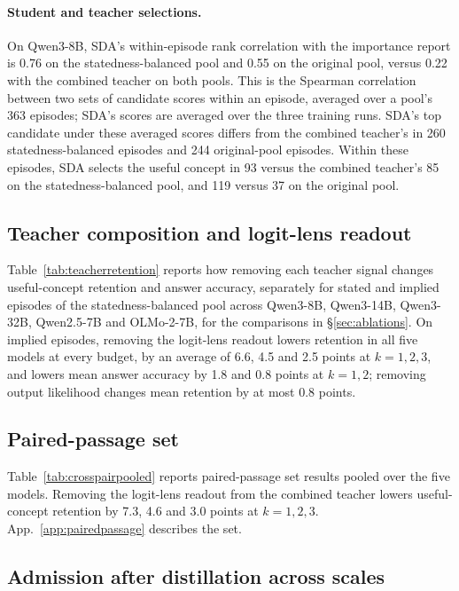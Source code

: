 \paragraph{Student and teacher selections.}
On Qwen3-8B, SDA's within-episode rank correlation with the importance report is 0.76 on the statedness-balanced pool and 0.55 on the original pool, versus 0.22 with the combined teacher on both pools. This is the Spearman correlation between two sets of candidate scores within an episode, averaged over a pool's 363 episodes; SDA's scores are averaged over the three training runs. SDA's top candidate under these averaged scores differs from the combined teacher's in 260 statedness-balanced episodes and 244 original-pool episodes. Within these episodes, SDA selects the useful concept in 93 versus the combined teacher's 85 on the statedness-balanced pool, and 119 versus 37 on the original pool.



\subsection{Teacher composition and logit-lens readout}
\label{app:teacherreadout}
Table~\ref{tab:teacherretention} reports how removing each teacher signal changes useful-concept retention and answer accuracy, separately for stated and implied episodes of the statedness-balanced pool across Qwen3-8B, Qwen3-14B, Qwen3-32B, Qwen2.5-7B and OLMo-2-7B, for the comparisons in \S\ref{sec:ablations}.
On implied episodes, removing the logit-lens readout lowers retention in all five models at every budget, by an average of 6.6, 4.5 and 2.5 points at $k=1,2,3$, and lowers mean answer accuracy by 1.8 and 0.8 points at $k=1,2$; removing output likelihood changes mean retention by at most 0.8 points.



\subsection{Paired-passage set}
\label{app:pairedresults}
Table~\ref{tab:crosspairpooled} reports paired-passage set results pooled over the five models. Removing the logit-lens readout from the combined teacher lowers useful-concept retention by 7.3, 4.6 and 3.0 points at $k=1,2,3$.
App.~\ref{app:pairedpassage} describes the set.




\subsection{Admission after distillation across scales}
\label{app:sdascale}

